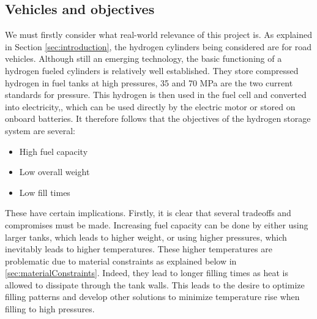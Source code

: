 


\subsection{Vehicles and objectives}

We must firstly consider what real-world relevance of this project is. As explained in Section \ref{sec:introduction}, the hydrogen cylinders being considered are for road vehicles.  Although still an emerging technology, the basic functioning of a hydrogen fueled cylinders is relatively well established. They store compressed hydrogen in fuel tanks at high pressures, 35 and 70 MPa are the two current standards  for pressure. This hydrogen is then used in the fuel cell and converted into electricity,, which can be used directly by the electric motor or stored on onboard batteries. It therefore follows that the objectives of the hydrogen storage system are several:

\begin{itemize}
\item High fuel capacity
\item Low overall weight
\item Low fill times
\end{itemize}
These have certain implications. Firstly, it is clear that several tradeoffs and compromises must be made. Increasing fuel capacity can be done by either using larger tanks, which leads to higher weight, or using higher pressures, which inevitably leads to higher temperatures. These higher temperatures are problematic due to material constraints as explained below in \cref{sec:materialConstraints}. Indeed, they lead to longer filling times as heat is allowed to dissipate through the tank walls. This leads to the desire to optimize filling patterns and develop other solutions to minimize temperature rise when filling to high pressures.

